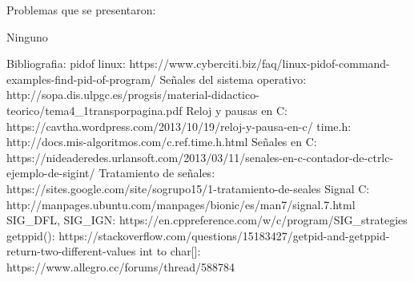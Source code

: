 \documentclass[12pt, a4paper]{report}
\begin{document}
\begin{center}
Problemas que se presentaron: 

Ninguno


\bigskip

\end{center}
\begin{center}
Bibliografia:
pidof linux:
https://www.cyberciti.biz/faq/linux-pidof-command-examples-find-pid-of-program/
Señales del sistema operativo:
http://sopa.dis.ulpgc.es/progsis/material-didactico-teorico/tema4_1transporpagina.pdf
Reloj y pausas en C:
https://cavtha.wordpress.com/2013/10/19/reloj-y-pausa-en-c/
time.h:
http://docs.mis-algoritmos.com/c.ref.time.h.html
Señales en C:
https://nideaderedes.urlansoft.com/2013/03/11/senales-en-c-contador-de-ctrlc-ejemplo-de-sigint/
Tratamiento de señales:
https://sites.google.com/site/sogrupo15/1-tratamiento-de-seales
Signal C:
http://manpages.ubuntu.com/manpages/bionic/es/man7/signal.7.html
SIG_DFL, SIG_IGN:
https://en.cppreference.com/w/c/program/SIG_strategies
getppid():
https://stackoverflow.com/questions/15183427/getpid-and-getppid-return-two-different-values
int to char[]:
https://www.allegro.cc/forums/thread/588784
\end{center}
\end{document}
